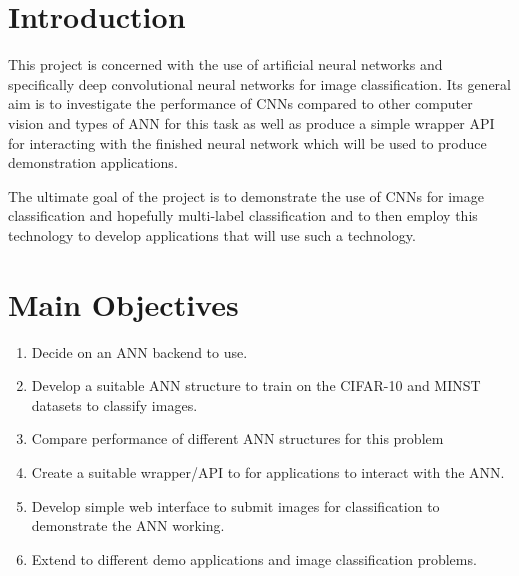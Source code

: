 \documentclass[a0,portrait]{a0poster}
\begin{document}
\begin{multicols}{2} %



\color{SaddleBrown} %

\section*{Introduction}

This project is concerned with the use of artificial neural networks and specifically deep convolutional neural networks for image classification. Its general aim is to investigate the performance of CNNs compared to other computer vision and types of ANN for this task as well as produce a simple wrapper API for interacting with the finished neural network which will be used to produce demonstration applications.

The ultimate goal of the project is to demonstrate the use of CNNs for image classification and hopefully multi-label classification and to then employ this technology to develop applications that will use such a technology.


\color{DarkSlateGray} %

\section*{Main Objectives}

\begin{enumerate}
\item Decide on an ANN backend to use.
\item Develop a suitable ANN structure to train on the CIFAR-10 and MINST datasets to classify images.
\item Compare performance of different ANN structures for this problem
\item Create a suitable wrapper/API to for applications to interact with the ANN.
\item Develop simple web interface to submit images for classification to demonstrate the ANN working.
\item Extend to different demo applications and image classification problems.
\end{enumerate}


\end{multicols}
\end{document}
